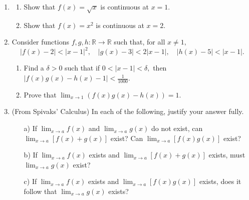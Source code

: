 \documentclass[11pt]{article}
\newcommand{\bbR}{\mathbb{R}}
\renewcommand{\_}[1]{\underline{ #1 }}
\theoremstyle{definition}
\numberwithin{equation}{subsection}
\begin{document}
\begin{enumerate}
\begin{enumerate}
\begin{proof}
If \(\lim_{x\rightarrow x_0^+}f(x)\) and \(\lim_{x\rightarrow x_0^-}f(x)\) both exist and equal \(L\), then for all \( \epsilon>0 \), there exists some \(\delta_1>0\) such that if \(x\in A\) and \(0<x-x_0<\delta_1\), then \(|f(x)-L|<\epsilon\), and similarly, for all \( \epsilon>0 \), there exists some \(\delta_2>0\) such that if \(x\in A\) and \(0<x_0-x<\delta_2\), then \(|f(x)-L|<\epsilon\). Choose \(\delta=\min(\delta_1, \delta_2)\) so that it satisfies both constraints, and we note that $\delta>0$. Thus, for all \( \epsilon>0 \), we have that if \(x\in A\) and \(0<|x-x_0|<\delta\), then \(|f(x)-L|<\epsilon\). Hence, \(\lim_{x\rightarrow x_0}f(x)\) exists and equals \(L\). This completes the second direction.

This completes the proof.

\renewcommand\qedsymbol{QED}
\end{proof}


\end{enumerate}

\item 
\begin{enumerate}
\item Show that $f(x)=\sqrt{x}$ is continuous at $x=1.$
\item Show that $f(x)=x^2$ is continuous at $x=2.$
\end{enumerate}

\item Consider functions $f,g,h:\bbR\to\bbR$ such that, for all $x\neq 1,$ 
$$|f(x)-2|<|x-1|^2,\quad |g(x)-3|<2|x-1|,\quad |h(x)-5|<|x-1|.$$
\begin{enumerate}
\item Find a $\delta>0$ such that if $0<|x-1|<\delta,$ then $|f(x)g(x)-h(x)-1|<\frac{1}{1000}.$
\item Prove that $\displaystyle \lim_{x\to 1} (f(x)g(x)-h(x))=1.$
\end{enumerate}

\item (From Spivaks' Calculus)
In each of the following, justify your answer fully.
\begin{enumerate}
\item[a)] If $\displaystyle \lim_{x\longrightarrow a} f(x)$ and $\displaystyle \lim_{x\longrightarrow a}g(x)$ do not exist, can $\displaystyle \lim_{x\longrightarrow a}[f(x)+g(x)] $ exist? Can $\displaystyle \lim_{x\longrightarrow a}[f(x)g(x)] $ exist?
\item[b)] If $\displaystyle \lim_{x\longrightarrow a} f(x)$ exists and $\displaystyle \lim_{x\longrightarrow a}[f(x)+g(x)]$ exists, must $\displaystyle \lim_{x\longrightarrow a}g(x)$ exist?
\item[c)] If $\displaystyle \lim_{x\longrightarrow a}f(x)$ exists and $\displaystyle \lim_{x\longrightarrow a}[f(x)g(x)]$ exists, does it follow that $\displaystyle \lim_{x\longrightarrow a}g(x)$ exists?
\end{enumerate}


\end{enumerate}
\end{document}
